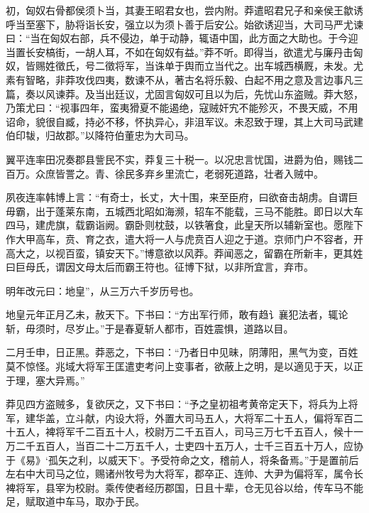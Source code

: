 \documentclass[12pt,UTF8]{ctexbook}
\begin{document}
初，匈奴右骨都侯须卜当，其妻王昭君女也，尝内附。莽遣昭君兄子和亲侯王歙诱呼当至塞下，胁将诣长安，强立以为须卜善于后安公。始欲诱迎当，大司马严尤谏曰：“当在匈奴右部，兵不侵边，单于动静，辄语中国，此方面之大助也。于今迎当置长安槁街，一胡人耳，不如在匈奴有益。”莽不听。即得当，欲遣尤与廉丹击匈奴，皆赐姓徵氏，号二徵将军，当诛单于舆而立当代之。出车城西横厩，未发。尤素有智略，非莽攻伐四夷，数谏不从，著古名将乐毅、白起不用之意及言边事凡三篇，奏以风谏莽。及当出廷议，尤固言匈奴可且以为后，先忧山东盗贼。莽大怒，乃策尤曰：“视事四年，蛮夷猾夏不能遏绝，寇贼奸宄不能殄灭，不畏天威，不用诏命，貌很自臧，持必不移，怀执异心，非沮军议。未忍致于理，其上大司马武建伯印韨，归故郡。”以降符伯董忠为大司马。



翼平连率田况奏郡县訾民不实，莽复三十税一。以况忠言忧国，进爵为伯，赐钱二百万。众庶皆詈之。青、徐民多弃乡里流亡，老弱死道路，壮者入贼中。



夙夜连率韩博上言：“有奇士，长丈，大十围，来至臣府，曰欲奋击胡虏。自谓巨毋霸，出于蓬莱东南，五城西北昭如海濒，轺车不能载，三马不能胜。即日以大车四马，建虎旗，载霸诣阙。霸卧则枕鼓，以铁箸食，此皇天所以辅新室也。愿陛下作大甲高车，贲、育之衣，遣大将一人与虎贲百人迎之于道。京师门户不容者，开高大之，以视百蛮，镇安天下。”博意欲以风莽。莽闻恶之，留霸在所新丰，更其姓曰巨母氏，谓因文母太后而霸王符也。征博下狱，以非所宜言，弃市。



明年改元曰：地皇”，从三万六千岁历号也。



地皇元年正月乙未，赦天下。下书曰：“方出军行师，敢有趋讠襄犯法者，辄论斩，毋须时，尽岁止。”于是春夏斩人都市，百姓震惧，道路以目。



二月壬申，日正黑。莽恶之，下书曰：“乃者日中见昧，阴薄阳，黑气为变，百姓莫不惊怪。兆域大将军王匡遣吏考问上变事者，欲蔽上之明，是以適见于天，以正于理，塞大异焉。”



莽见四方盗贼多，复欲厌之，又下书曰：“予之皇初祖考黄帝定天下，将兵为上将军，建华盖，立斗献，内设大将，外置大司马五人，大将军二十五人，偏将军百二十五人，裨将军千二百五十人，校尉万二千五百人，司马三万七千五百人，候十一万二千五百人，当百二十二万五千人，士吏四十五万人，士千三百五十万人，应协于《易》‘孤矢之利，以威天下’。予受符命之文，稽前人，将条备焉。”于是置前后左右中大司马之位，赐诸州牧号为大将军，郡卒正、连帅、大尹为偏将军，属令长裨将军，县宰为校尉。乘传使者经历郡国，日且十辈，仓无见谷以给，传车马不能足，赋取道中车马，取办于民。
\end{document}
